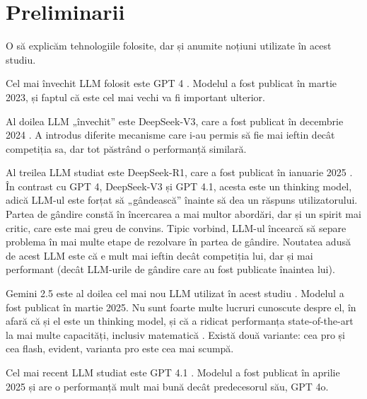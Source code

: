 \chapter{Preliminarii}

O să explicăm tehnologiile folosite, dar și anumite noțiuni utilizate în acest studiu.

Cel mai învechit LLM folosit este GPT 4 \cite{gpt4}. Modelul a fost publicat în martie 2023, și faptul că este cel mai vechi va fi important ulterior.

Al doilea LLM „învechit” este DeepSeek-V3, care a fost publicat în decembrie 2024 \cite{v3}. A introdus diferite mecanisme care i-au permis să fie mai ieftin decât
competiția sa, dar tot păstrând o performanță similară.

Al treilea LLM studiat este DeepSeek-R1, care a fost publicat în ianuarie 2025 \cite{r1}. În contrast cu GPT 4, DeepSeek-V3 și GPT 4.1, acesta este un thinking model,
adică LLM-ul este forțat să „gândească” înainte să dea un răspuns utilizatorului. Partea de gândire constă în încercarea a mai multor abordări, dar și
un spirit mai critic, care este mai greu de convins. Tipic vorbind, LLM-ul încearcă să separe problema în mai multe etape de rezolvare în partea de gândire.
Noutatea adusă de acest LLM este că e mult mai ieftin decât competiția lui, dar și mai performant (decât LLM-urile de gândire care au fost publicate înaintea lui).

Gemini 2.5 este al doilea cel mai nou LLM utilizat în acest studiu \cite{gemini}. Modelul a fost publicat în martie 2025. Nu sunt foarte multe lucruri cunoscute despre el, în afară că și el este
un thinking model, și că a ridicat performanța state-of-the-art la mai multe capacități, inclusiv matematică \cite{gemini}. Există două variante: cea pro și cea flash,
evident, varianta pro este cea mai scumpă.

Cel mai recent LLM studiat este GPT 4.1 \cite{gpt41}. Modelul a fost publicat în aprilie 2025 și are o performanță mult mai bună decât predecesorul său, GPT 4o.

